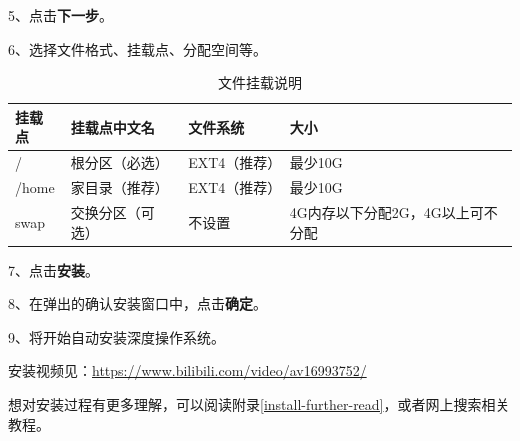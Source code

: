 \documentclass[doctor,openright,twoside]{sjtuthesis}
\theoremstyle{plain}
\theoremstyle{definition}
\theoremstyle{remark}
\theoremstyle{ocrenumbox}
\theoremstyle{plain}
\begin{document}
5、点击\textbf{下一步}。

6、选择文件格式、挂载点、分配空间等。


\begin{longtable}{|L{1in}|L{1.2in}|L{1.2in}|L{1.9in}|}
\caption{\label{tab:mount}文件挂载说明} \\ \hline
\centerline{\textbf{挂载点}} & \centerline{\textbf{挂载点中文名}} & \centerline{\textbf{文件系统}} & \centerline{\textbf{大小}} \\
\hline
{}
/       &   根分区（必选）     &    EXT4（推荐）     &   最少10G \\
/home   &    家目录（推荐） &   EXT4（推荐）     &     最少10G \\
swap    &    交换分区（可选）&    不设置         &     4G内存以下分配2G，\newline 4G以上可不分配 \\
\hline
\end{longtable}

7、点击\textbf{安装}。

8、在弹出的确认安装窗口中，点击\textbf{确定}。

9、将开始自动安装深度操作系统。

安装视频见：\url{https://www.bilibili.com/video/av16993752/}

想对安装过程有更多理解，可以阅读附录\ref{install-further-read}，或者网上搜索相关教程。
\end{document}
